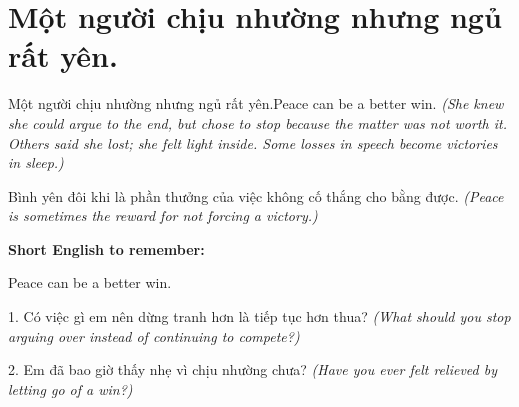 \section{Một người chịu nhường nhưng ngủ rất yên.}
\begin{truyen}{Một người chịu nhường nhưng ngủ rất yên.}{Peace can be a better win.}
\textit{(She knew she could argue to the end, but chose to stop because the matter was not worth it. Others said she lost; she felt light inside. Some losses in speech become victories in sleep.)}
\end{truyen}
\begin{baihoc}
Bình yên đôi khi là phần thưởng của việc không cố thắng cho bằng được.
\textit{(Peace is sometimes the reward for not forcing a victory.)}
\end{baihoc}
\begin{ghinhoanh}\textbf{Short English to remember:}

Peace can be a better win.
\end{ghinhoanh}
\begin{tuhocnhanh}
1. Có việc gì em nên dừng tranh hơn là tiếp tục hơn thua? \textit{(What should you stop arguing over instead of continuing to compete?)}

2. Em đã bao giờ thấy nhẹ vì chịu nhường chưa? \textit{(Have you ever felt relieved by letting go of a win?)}
\end{tuhocnhanh}
\ngancach

